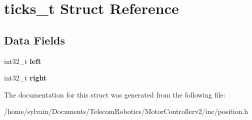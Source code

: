 \hypertarget{structticks__t}{}\section{ticks\+\_\+t Struct Reference}
\label{structticks__t}
\subsection*{Data Fields}
\begin{DoxyCompactItemize}
\item 
\hypertarget{structticks__t_a7fc72fad117c3cd9bd6dad053ba56096}{}\label{structticks__t_a7fc72fad117c3cd9bd6dad053ba56096} 
int32\+\_\+t {\bfseries left}
\item 
\hypertarget{structticks__t_a58bf803972d149fb7069ab00d7cadc47}{}\label{structticks__t_a58bf803972d149fb7069ab00d7cadc47} 
int32\+\_\+t {\bfseries right}
\end{DoxyCompactItemize}


The documentation for this struct was generated from the following file\+:\begin{DoxyCompactItemize}
\item 
/home/sylvain/\+Documents/\+Telecom\+Robotics/\+Motor\+Controllerv2/inc/position.\+h\end{DoxyCompactItemize}
